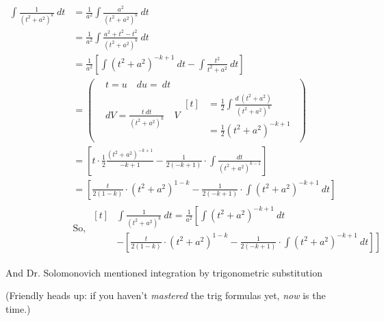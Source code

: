 \documentclass{article}
\begin{document}
\begin{align*}
\int\frac{1}{(t^2+a^2)^k}\ dt&=\frac{1}{a^2}\int\frac{a^2}{(t^2+a^2)^k}\ dt\\
&=\frac{1}{a^2}\int\frac{a^2+t^2-t^2}{(t^2+a^2)^k}\ dt\\
&=\frac{1}{a^2}\left[\int(t^2+a^2)^{-k+1}\ dt-\int\frac{t^2}{t^2+a^2}\ dt\right]\\
&=\left(\begin{aligned}&t=u\quad du=\ dt\\&dV=\frac{t\ dt}{(t^2+a^2)^k}\quad V\begin{aligned}[t]&=\frac{1}{2}\int\frac{d\ (t^2+a^2)}{(t^2+a^2)^k}\\&=\frac{1}{2}(t^2+a^2)^{-k+1}\end{aligned}\end{aligned}\right)\\
&=\left[t\cdot\frac{1}{2}\frac{(t^2+a^2)^{-k+1}}{-k+1}-\frac{1}{2(-k+1)}\cdot\int\frac{dt}{(t^2+a^2)^{k-1}}\right]\\
&=\left[\frac{t}{2(1-k)}\cdot(t^2+a^2)^{1-k}-\frac{1}{2(-k+1)}\cdot\int(t^2+a^2)^{-k+1}\ dt\right]\\
&\mbox{So, }\begin{aligned}[t]&\int\frac{1}{(t^2+a^2)^k}\ dt=\frac{1}{a^2}\left[\int(t^2+a^2)^{-k+1}\ dt\right.\\&\left.-\left[\frac{t}{2(1-k)}\cdot(t^2+a^2)^{1-k}-\frac{1}{2(-k+1)}\cdot\int(t^2+a^2)^{-k+1}\ dt\right]\right]\end{aligned}
\end{align*}

\vspace{10pt}

And Dr. Solomonovich mentioned integration by trigonometric substitution

(Friendly heads up: if you haven't \textit{mastered} the trig formulas yet, \textit{now} is the time.)
\end{document}
